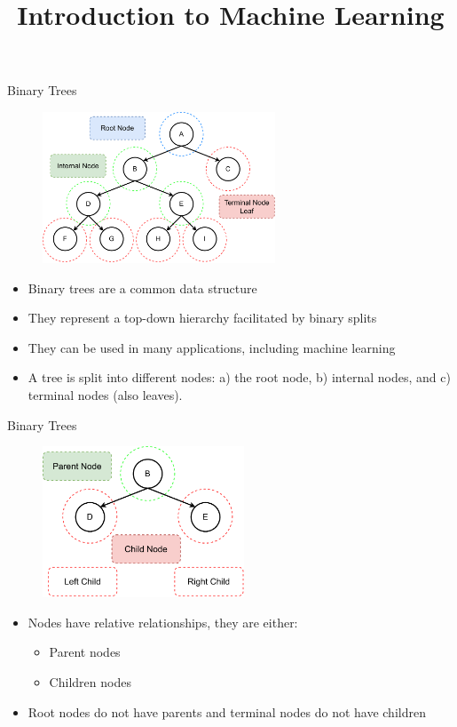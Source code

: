 \documentclass[11pt,compress,t,notes=noshow, xcolor=table]{beamer}
\title{Introduction to Machine Learning}
\institute{\href{https://compstat-lmu.github.io/lecture_i2ml/}{compstat-lmu.github.io/lecture\_i2ml}}
\date{}
\begin{document}
\sloppy

\begin{vbframe}{Binary Trees}
    \begin{figure}
    \centering
      \includegraphics[height = 4.5cm, keepaspectratio]{figure/cart_intro_binary-tree_1.pdf}
    \end{figure}
  \begin{itemize}
    \item Binary trees are a common data structure
    \item They represent a top-down hierarchy facilitated by binary splits
    \item They can be used in many applications, including machine learning
    \item A tree is split into different nodes: a) the root node, b) internal nodes, and c) terminal nodes (also leaves).
  \end{itemize}
\end{vbframe}

\begin{vbframe}{Binary Trees}
    \begin{figure}
    \centering
      \includegraphics[height = 4.5cm, keepaspectratio]{figure/cart_intro_binary-tree_2.pdf}
    \end{figure}
  \begin{itemize}
    \item Nodes have relative relationships, they are either:
    \begin{itemize}
    \item Parent nodes
    \item Children nodes
    \end{itemize}
    \item Root nodes do not have parents and terminal nodes do not have children
  \end{itemize}
\end{vbframe}
\end{document}
